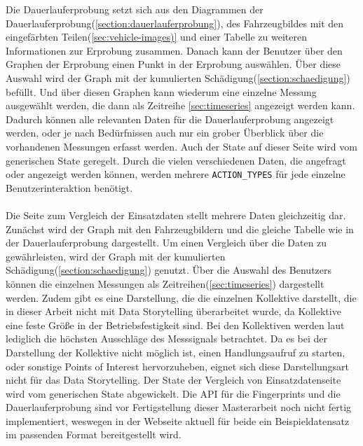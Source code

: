 Die Dauerlauferprobung setzt sich aus den Diagrammen der Dauerlauferprobung(\ref{section:dauerlauferprobung}), des Fahrzeugbildes mit den eingefärbten Teilen(\ref{sec:vehicle-images)} und einer Tabelle zu weiteren Informationen zur Erprobung zusammen. Danach kann der Benutzer über den Graphen der Erprobung einen Punkt in der Erprobung auswählen. Über diese Auswahl wird der Graph mit der kumulierten Schädigung(\ref{section:schaedigung}) befüllt. Und über diesen Graphen kann wiederum eine einzelne Messung ausgewählt werden, die dann als Zeitreihe \ref{sec:timeseries} angezeigt werden kann. Dadurch können alle relevanten Daten für die Dauerlauferprobung angezeigt werden, oder je nach Bedürfnissen auch nur ein grober Überblick über die vorhandenen Messungen erfasst werden. Auch der State auf dieser Seite wird vom generischen State geregelt. Durch die vielen verschiedenen Daten, die angefragt oder angezeigt werden können, werden mehrere \texttt{ACTION\_TYPES} für jede einzelne Benutzerinteraktion benötigt.\\\\
Die Seite zum Vergleich der Einsatzdaten stellt mehrere Daten gleichzeitig dar. Zunächst wird der Graph mit den Fahrzeugbildern und die gleiche Tabelle wie in der Dauerlauferprobung dargestellt. Um einen Vergleich über die Daten zu gewährleisten, wird der Graph mit der kumulierten Schädigung(\ref{section:schaedigung}) genutzt. Über die Auswahl des Benutzers können die einzelnen Messungen als Zeitreihen(\ref{sec:timeseries}) dargestellt werden. Zudem gibt es eine Darstellung, die die einzelnen Kollektive darstellt, die in dieser Arbeit nicht mit Data Storytelling überarbeitet wurde, da Kollektive eine feste Größe in der Betriebsfestigkeit \cite{Gotz.2020} sind. Bei den Kollektiven werden laut \cite{PatrickPfeiffer.17.10.2022} lediglich die höchsten Ausschläge des Messsignals betrachtet. Da es bei der Darstellung der Kollektive nicht möglich ist, einen Handlungsaufruf zu starten, oder sonstige Points of Interest hervorzuheben, eignet sich diese Darstellungsart nicht für das Data Storytelling. Der State der Vergleich von Einsatzdatenseite wird vom generischen State abgewickelt. Die API für die Fingerprints und die Dauerlauferprobung sind vor Fertigstellung dieser Masterarbeit noch nicht fertig implementiert, weswegen in der Webseite aktuell für beide ein Beispieldatensatz im passenden Format bereitgestellt wird.\\\\
